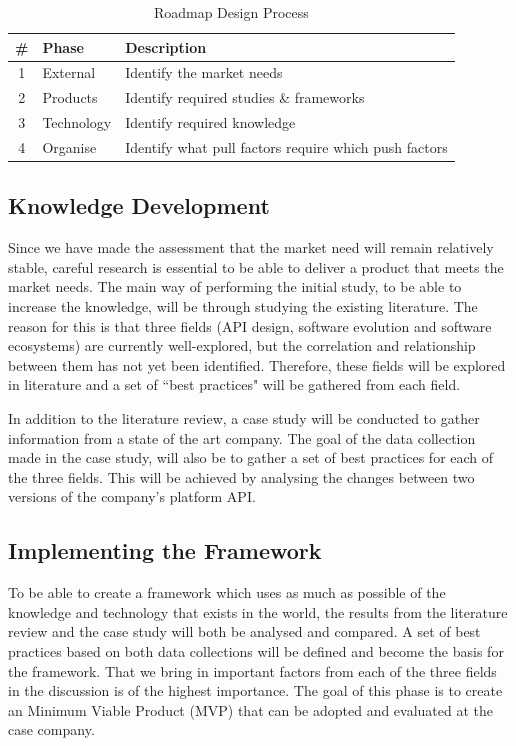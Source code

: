\documentclass{article}
\begin{document}
\begin{table}[ht]
\centering
\begin{tabular}[ht]{|c|l|l|}
\hline
\textbf{\#} & \textbf{Phase} & \textbf{Description} \\
\hline
1 & External & Identify the market needs \\
\hline
2 & Products & Identify required studies \& frameworks \\
\hline
3 & Technology & Identify required knowledge \\
\hline
4 & Organise & Identify what pull factors require which push factors \\
\hline
\end{tabular}
\caption{Roadmap Design Process}
\label{tab:proc}
\end{table}

\subsection{Knowledge Development}
Since we have made the assessment that the market need will remain relatively stable, careful research is essential to be able to deliver a product that meets the market needs. The main way of performing the initial study, to be able to increase the knowledge, will be through studying the existing literature. The reason for this is that three fields (API design, software evolution and software ecosystems) are currently well-explored, but the correlation and relationship between them has not yet been identified. Therefore, these fields will be explored in literature and a set of ``best practices" will be gathered from each field. 

In addition to the literature review, a case study will be conducted to gather information from a state of the art company. The goal of the data collection made in the case study, will also be to gather a set of best practices for each of the three fields. This will be achieved by analysing the changes between two versions of the company's platform API. 

\subsection{Implementing the Framework}
To be able to create a framework which uses as much as possible of the knowledge and technology that exists in the world, the results from the literature review and the case study will both be analysed and compared. A set of best practices based on both data collections will be defined and become the basis for the framework. That we bring in important factors from each of the three fields in the discussion is of the highest importance. The goal of this phase is to create an Minimum Viable Product (MVP) that can be adopted and evaluated at the case company. 
\end{document}
